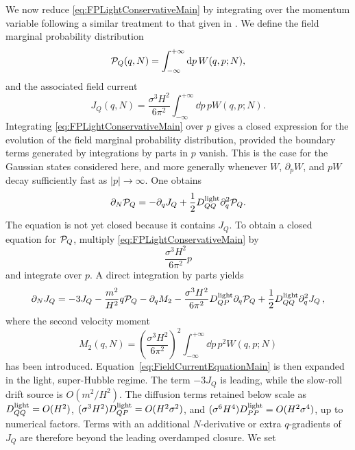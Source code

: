 \documentclass{article}
\numberwithin{equation}{section}
\begin{document}
	We now reduce \cref{eq:FPLightConservativeMain} by integrating over the momentum variable following a similar treatment to that given in \cite{pavliotis2014stochastic}. We define the field marginal probability distribution
	\begin{equation}
		{\cal P}_Q(q,N)
		=
		\int_{-\infty}^{+\infty}\dd p\,W(q,p;N),
		\label{eq:FieldMarginalWignerMain}
	\end{equation}
	and the associated field current
	\begin{equation}
		J_Q(q,N)
		=
		\frac{\sigma^3H^2}{6\pi^2}
		\int_{-\infty}^{+\infty}\dd p\,pW(q,p;N).
		\label{eq:FieldCurrentMain}
	\end{equation}
	Integrating \cref{eq:FPLightConservativeMain} over \(p\) gives a closed expression for the evolution of the field marginal probability distribution, provided the boundary terms generated by integrations by parts in \(p\) vanish. This is the case for the Gaussian states considered here, and more generally whenever \(W\), \(\partial_p W\), and \(pW\) decay sufficiently fast as \(|p|\to\infty\). One obtains
	\begin{equation}
		\partial_N{\cal P}_Q
		=
		-\partial_qJ_Q
		+
		\frac12D_{QQ}^{\rm light}\partial_q^2{\cal P}_Q .
		\label{eq:FieldMarginalMain}
	\end{equation}
	The equation is not yet closed because it contains \(J_Q\). To obtain a closed equation for \({\cal P}_Q\), multiply \cref{eq:FPLightConservativeMain} by
	\[
	\frac{\sigma^3H^2}{6\pi^2}p
	\]
	and integrate over \(p\). A direct integration by parts yields
	\begin{align}
		\partial_NJ_Q
		=
		-3J_Q
		-
		\frac{m^2}{H^2}q{\cal P}_Q
		-
		\partial_qM_2
		-
		\frac{\sigma^3H^2}{6\pi^2}
		D_{QP}^{\rm light}\partial_q{\cal P}_Q
		+
		\frac12D_{QQ}^{\rm light}\partial_q^2J_Q \, ,
		\label{eq:FieldCurrentEquationMain}
	\end{align}
    where the second velocity moment
	\begin{equation}
		M_2(q,N)
		=
		\left(\frac{\sigma^3H^2}{6\pi^2}\right)^2
		\int_{-\infty}^{+\infty}\dd p\,p^2W(q,p;N)
		\label{eq:SecondVelocityMomentMain}
	\end{equation}
    has been introduced.
	Equation~\eqref{eq:FieldCurrentEquationMain} is then expanded in the light, super-Hubble regime. The term \(-3J_Q\) is leading, while the slow-roll drift source is \(O(m^2/H^2)\). The diffusion terms retained below scale as \(D_{QQ}^{\rm light}=O(H^2)\), \((\sigma^3H^2)D_{QP}^{\rm light}=O(H^2\sigma^2)\), and \((\sigma^6H^4)D_{PP}^{\rm light}=O(H^2\sigma^4)\), up to numerical factors. Terms with an additional \(N\)-derivative or extra \(q\)-gradients of \(J_Q\) are therefore beyond the leading overdamped closure. We set
\end{document}
